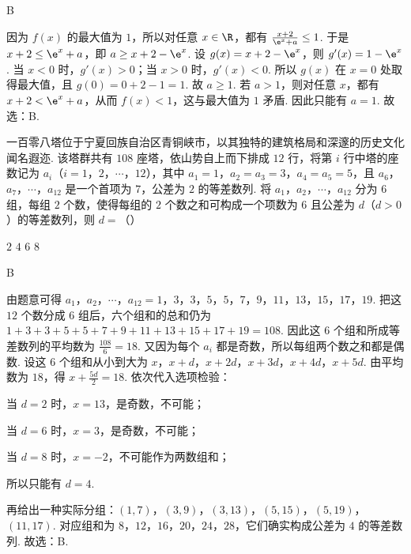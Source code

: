 \begin{answer}
B
\end{answer}

\begin{solution}
因为 \(f(x)\) 的最大值为 \(1\)，所以对任意 \(x\in\R\)，都有 \(\frac{x+2}{\e^x+a}\le 1\). 于是 \(x+2\le \e^x+a\)，即 \(a\ge x+2-\e^x\). 设 \(g(x)=x+2-\e^x\)，则 \(g'(x)=1-\e^x\). 当 \(x<0\) 时，\(g'(x)>0\)；当 \(x>0\) 时，\(g'(x)<0\). 所以 \(g(x)\) 在 \(x=0\) 处取得最大值，且 \(g(0)=0+2-1=1\). 故 \(a\ge 1\).
若 \(a>1\)，则对任意 \(x\)，都有 \(x+2<\e^x+a\)，从而 \(f(x)<1\)，这与最大值为 \(1\) 矛盾. 因此只能有 \(a=1\). 故选：B.
\end{solution}

\begin{problem}
一百零八塔位于宁夏回族自治区青铜峡市，以其独特的建筑格局和深邃的历史文化闻名遐迩. 该塔群共有 \(108\) 座塔，依山势自上而下排成 \(12\) 行，将第 \(i\) 行中塔的座数记为 \(a_i\)（\(i=1\)，\(2\)，\(\cdots\)，\(12\)），其中 \(a_1=1\)，\(a_2=a_3=3\)，\(a_4=a_5=5\)，且 \(a_6\)，\(a_7\)，\(\cdots\)，\(a_{12}\) 是一个首项为 \(7\)，公差为 \(2\) 的等差数列. 将 \(a_1\)，\(a_2\)，\(\cdots\)，\(a_{12}\) 分为 \(6\) 组，每组 \(2\) 个数，使得每组的 \(2\) 个数之和可构成一个项数为 \(6\) 且公差为 \(d\)（\(d>0\)）的等差数列，则 \(d=\)（\quad）

\choices
    {\(2\)}
    {\(4\)}
    {\(6\)}
    {\(8\)}
\end{problem}

\begin{answer}
B
\end{answer}

\begin{solution}
由题意可得 \(a_1\)，\(a_2\)，\(\cdots\)，\(a_{12}=1\)，\(3\)，\(3\)，\(5\)，\(5\)，\(7\)，\(9\)，\(11\)，\(13\)，\(15\)，\(17\)，\(19\). 把这 \(12\) 个数分成 \(6\) 组后，六个组和的总和仍为 \(1+3+3+5+5+7+9+11+13+15+17+19=108\). 因此这 \(6\) 个组和所成等差数列的平均数为 \(\frac{108}{6}=18\).
又因为每个 \(a_i\) 都是奇数，所以每组两个数之和都是偶数. 设这 \(6\) 个组和从小到大为 \(x\)，\(x+d\)，\(x+2d\)，\(x+3d\)，\(x+4d\)，\(x+5d\). 由平均数为 \(18\)，得 \(x+\frac{5d}{2}=18\).
依次代入选项检验：

当 \(d=2\) 时，\(x=13\)，是奇数，不可能；

当 \(d=6\) 时，\(x=3\)，是奇数，不可能；

当 \(d=8\) 时，\(x=-2\)，不可能作为两数组和；

所以只能有 \(d=4\).

再给出一种实际分组：\(\left( 1,7 \right)\)，\(\left( 3,9 \right)\)，\(\left( 3,13 \right)\)，\(\left( 5,15 \right)\)，\(\left( 5,19 \right)\)，\(\left( 11,17 \right)\). 对应组和为 \(8\)，\(12\)，\(16\)，\(20\)，\(24\)，\(28\)，它们确实构成公差为 \(4\) 的等差数列. 故选：B.
\end{solution}

